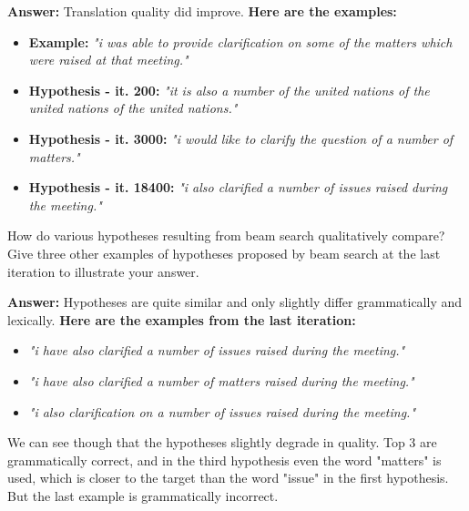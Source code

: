 \begin{parts}
\begin{subparts}
        
        
        {\color{red}
            \textbf{Answer:}
            Translation quality did improve.
            \newline
            \textbf{Here are the examples:}
            \begin{itemize}
                \item
                \textbf{Example:} \textit{"i was able to provide clarification on some of the matters which were raised at that meeting."}
                \item
                \textbf{Hypothesis - it. 200:} \textit{"it is also a number of the united nations of the united nations of the united nations."}
                \item
                \textbf{Hypothesis - it. 3000:} \textit{"i would like to clarify the question of a number of matters."}
                \item
                \textbf{Hypothesis - it. 18400:} \textit{"i also clarified a number of issues raised during the meeting."}
                \newline

            \end{itemize}
        }
        
        \subpart[2] How do various hypotheses resulting from beam search qualitatively compare? Give three other examples of hypotheses proposed by beam search at the last iteration to illustrate your answer.
        \newline
        
        {\color{red}
            \textbf{Answer:}
            Hypotheses are quite similar and only slightly differ grammatically and lexically.
            \newline
            \textbf{Here are the examples from the last iteration:}
            \begin{itemize}
                \item
                \textit{"i have also clarified a number of issues raised during the meeting."}
                \item
                \textit{"i have also clarified a number of matters raised during the meeting."}
                \item
                \textit{"i also clarification on a number of issues raised during the meeting."}
            \end{itemize}
            We can see though that the hypotheses slightly degrade in quality. Top 3 are grammatically correct, and in the third hypothesis even the word "matters" is used, which is closer to the target than the word "issue" in the first hypothesis. But the last example is grammatically incorrect.
        }
        

\end{subparts}
\end{parts}
